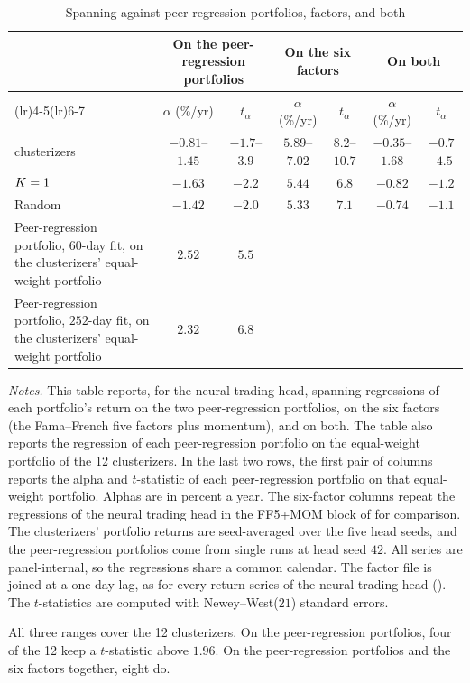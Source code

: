 \begin{table}[tb]
\centering
\caption{Spanning against peer-regression portfolios, factors, and both}
\label{tab:peer}
\begin{threeparttable}
\small
\setlength{\tabcolsep}{3pt}
\begin{tabular}{@{}>{\raggedright\arraybackslash}p{3.9cm}cccccc@{}}
\toprule
& \multicolumn{2}{c}{On the peer-regression portfolios}
& \multicolumn{2}{c}{On the six factors}
& \multicolumn{2}{c}{On both} \\
\cmidrule(lr){2-3}\cmidrule(lr){4-5}\cmidrule(lr){6-7}
& $\alpha$ (\%/yr) & $t_\alpha$ & $\alpha$ (\%/yr) & $t_\alpha$ & $\alpha$ (\%/yr) & $t_\alpha$ \\
\midrule
12 clusterizers\tnote{a} & $-0.81$--$1.45$ & $-1.7$--$3.9$ & $5.89$--$7.02$ & $8.2$--$10.7$ & $-0.35$--$1.68$ & $-0.7$--$4.5$ \\
$K=1$ & $-1.63$ & $-2.2$ & $5.44$ & $6.8$ & $-0.82$ & $-1.2$ \\
Random & $-1.42$ & $-2.0$ & $5.33$ & $7.1$ & $-0.74$ & $-1.1$ \\
\addlinespace
Peer-regression portfolio, $60$-day fit, on the clusterizers' equal-weight portfolio & $2.52$ & $5.5$ & & & & \\
Peer-regression portfolio, $252$-day fit, on the clusterizers' equal-weight portfolio & $2.32$ & $6.8$ & & & & \\
\bottomrule
\end{tabular}
\begin{tablenotes}[flushleft]\footnotesize
\item \emph{Notes.} This table reports, for the neural trading head, spanning regressions of each portfolio's return on the two peer-regression portfolios, on the six factors (the Fama--French five factors plus momentum), and on both. The table also reports the regression of each peer-regression portfolio on the equal-weight portfolio of the 12 clusterizers. In the last two rows, the first pair of columns reports the alpha and $t$-statistic of each peer-regression portfolio on that equal-weight portfolio. Alphas are in percent a year. The six-factor columns repeat the regressions of the neural trading head in the FF5+MOM block of  for comparison. The clusterizers' portfolio returns are seed-averaged over the five head seeds, and the peer-regression portfolios come from single runs at head seed $42$. All series are panel-internal, so the regressions share
a common calendar. The factor file is joined at a one-day lag, as for every return series of the neural trading head (). The $t$-statistics are computed with Newey--West($21$) standard errors.
\item[a] All three ranges cover the 12 clusterizers. On the peer-regression portfolios, four of the 12 keep a $t$-statistic above $1.96$. On the peer-regression portfolios and the six factors together, eight do.
\end{tablenotes}
\end{threeparttable}
\end{table}

